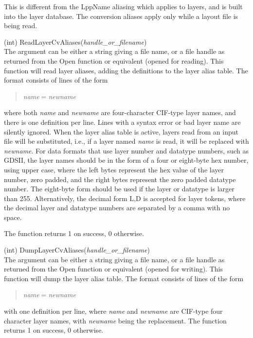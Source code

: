 This is different from the {\vt LppName} aliasing which applies to
{\Xic} layers, and is built into the layer database.  The conversion
aliases apply only while a layout file is being read.

\begin{description}
\item{(int) \vt ReadLayerCvAliases({\it handle\_or\_filename\/})}\\
The argument can be either a string giving a file name, or a file
handle as returned from the {\vt Open} function or equivalent (opened
for reading).  This function will read layer aliases, adding the
definitions to the layer alias table.  The format consists of lines of
the form
\begin{quote}
      {\it name\/}$=${\it newname}
\end{quote}
where both {\it name} and {\it newname} are four-character CIF-type
layer names, and there is one definition per line.  Lines with a
syntax error or bad layer name are silently ignored.  When the layer
alias table is active, layers read from an input file will be
substituted, i.e., if a layer named {\it name} is read, it will be
replaced with {\it newname}.  For data formats that use layer number
and datatype numbers, such as GDSII, the layer names should be in the
form of a four or eight-byte hex number, using upper case, where the
left bytes represent the hex value of the layer number, zero padded,
and the right bytes represent the zero padded datatype number.  The
eight-byte form should be used if the layer or datatype is larger than
255.  Alternatively, the decimal form L,D is accepted for layer
tokens, where the decimal layer and datatype numbers are separated by
a comma with no space.

The function returns 1 on success, 0 otherwise.

\item{(int) \vt DumpLayerCvAliases({\it handle\_or\_filename\/})}\\
The argument can be either a string giving a file name, or a file
handle as returned from the {\vt Open} function or equivalent (opened
for writing).  This function will dump the layer alias table.  The
format consists of lines of the form
\begin{quote}
      {\it name\/}$=${\it newname}
\end{quote}
with one definition per line, where {\it name} and {\it newname} are
CIF-type four character layer names, with {\it newname} being the
replacement.  The function returns 1 on success, 0 otherwise.


\end{description}
